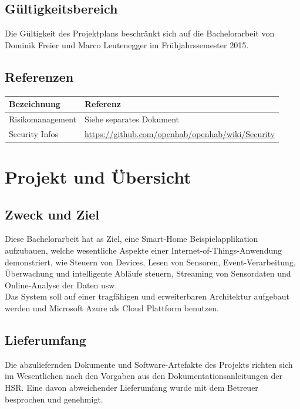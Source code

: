 \subsection*{Gültigkeitsbereich}
Die Gültigkeit des Projektplans beschränkt sich auf die Bachelorarbeit von Dominik Freier und Marco Leutenegger im Frühjahrssemester 2015.

\subsection*{Referenzen}
\begin{tabularx}{\textwidth}{lX}
	\textbf{Bezeichnung}	& \textbf{Referenz} \\
	\hline
	Risikomanagement		& Siehe separates Dokument\\
	\hline
	Security Infos		& \url{https://github.com/openhab/openhab/wiki/Security} \\
	\hline
\end{tabularx}
\pagebreak

\section*{Projekt und Übersicht}
\subsection*{Zweck und Ziel}
Diese Bachelorarbeit hat as Ziel, eine Smart-Home Beispielapplikation aufzubauen, welche wesentliche Aspekte einer Internet-of-Things-Anwendung demonstriert, wie Steuern von Devices, Lesen von Sensoren, Event-Verarbeitung, Überwachung und intelligente Abläufe steuern, Streaming von Sensordaten und Online-Analyse der Daten usw. \\
Das System soll auf einer tragfähigen und erweiterbaren Architektur aufgebaut werden und Microsoft Azure als Cloud Plattform benutzen.

\subsection*{Lieferumfang}
Die abzuliefernden Dokumente und Software-Artefakte des Projekts richten sich im Wesentlichen nach den Vorgaben aus den Dokumentationsanleitungen der HSR. Eine davon abweichender Lieferumfang wurde mit dem Betreuer besprochen und genehmigt.

